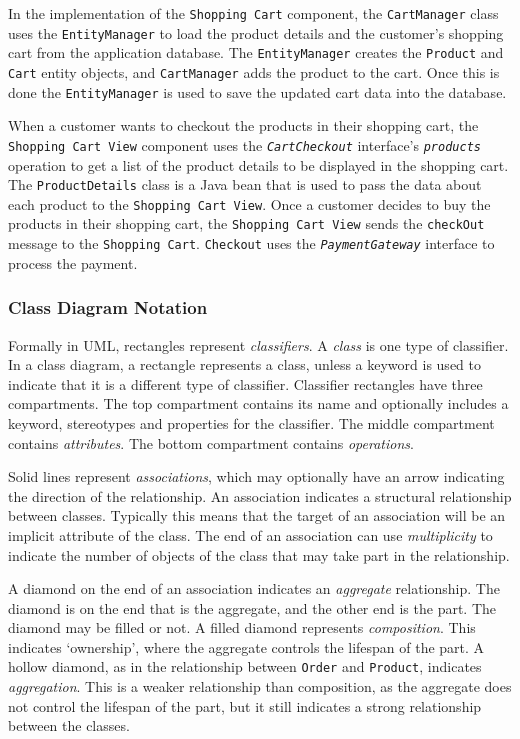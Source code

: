 In the implementation of the \texttt{Shopping Cart} component,
the \texttt{CartManager} class uses the \texttt{EntityManager}
to load the product details and the customer's shopping cart from the application database.
The \texttt{EntityManager} creates the \texttt{Product} and \texttt{Cart} entity objects,
and \texttt{CartManager} adds the product to the cart.
Once this is done the \texttt{EntityManager} is used to save the updated cart data into the database.

When a customer wants to checkout the products in their shopping cart, the \texttt{Shopping Cart View} component
uses the \texttt{\textsl{CartCheckout}} interface's \texttt{\textsl{products}} operation
to get a list of the product details to be displayed in the shopping cart.
The \texttt{ProductDetails} class is a Java bean that is used to pass the data about each product to the \texttt{Shopping Cart View}.
Once a customer decides to buy the products in their shopping cart,
the \texttt{Shopping Cart View} sends the \texttt{checkOut} message to the \texttt{Shopping Cart}.
\texttt{Checkout} uses the \texttt{\textsl{PaymentGateway}} interface to process the payment.

\subsubsection{Class Diagram Notation}\label{sec:classNotation}
Formally in UML, rectangles represent \emph{classifiers}. A \emph{class} is one type of classifier.
In a class diagram, a rectangle represents a class, unless a keyword is used to indicate that it is a different type of classifier.
Classifier rectangles have three compartments.
The top compartment contains its name and optionally includes a keyword, stereotypes and properties for the classifier.
The middle compartment contains \emph{attributes}.
The bottom compartment contains \emph{operations}.

Solid lines represent \emph{associations}, which may optionally have an arrow indicating the direction of the relationship.
An association indicates a structural relationship between classes.
Typically this means that the target of an association will be an implicit attribute of the class.
The end of an association can use \emph{multiplicity} to indicate the number of objects of the class that may take part in the relationship.

A diamond on the end of an association indicates an \emph{aggregate} relationship.
The diamond is on the end that is the aggregate, and the other end is the part.
The diamond may be filled or not. A filled diamond represents \emph{composition}.
This indicates `ownership', where the aggregate controls the lifespan of the part.
A hollow diamond, as in the relationship between \texttt{Order} and \texttt{Product},
indicates \emph{aggregation}.
This is a weaker relationship than composition, as the aggregate does not control the lifespan of the part,
but it still indicates a strong relationship between the classes.

